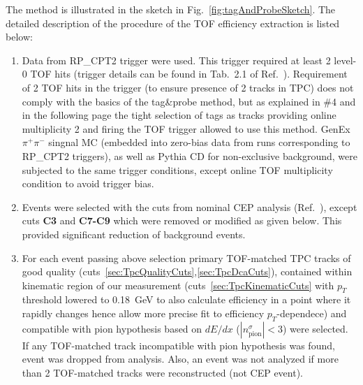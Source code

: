 The method is illustrated in the sketch in Fig.~\ref{fig:tagAndProbeSketch}. The detailed description of the procedure of the TOF efficiency extraction is listed below:
%
%
%
%
%
%
\begin{enumerate}
 \item Data from RP\_CPT2 trigger were used. This trigger required at least 2 level-0 TOF hits (trigger details can be found in Tab.~2.1 of Ref.~\cite{AnalysisNoteRafal}). Requirement of 2 TOF hits in the trigger (to ensure presence of 2 tracks in TPC) does not comply with the basics of the tag\&probe method, but as explained in \#4 and in the following page the tight selection of tags as tracks providing online multiplicity 2 and firing the TOF trigger allowed to use this method. GenEx $\pi^{+}\pi^{-}$ singnal MC (embedded into zero-bias data from runs corresponding to RP\_CPT2 triggers), as well as Pythia CD for non-exclusive background, were subjected to the same trigger conditions, except online TOF multiplicity condition to avoid trigger bias.\\[-20pt]%
 \item Events were selected with the cuts from nominal CEP analysis (Ref.~\cite{AnalysisNoteRafal}), except cuts \textbf{C3} and \textbf{C7-C9} which were removed or modified as given below. This provided significant reduction of background events.\\[-20pt]%
 \item For each event passing above selection primary TOF-matched TPC tracks of good quality (cuts~\ref{sec:TpcQualityCuts},\ref{sec:TpcDcaCuts}), contained within kinematic region of our measurement (cuts~\ref{sec:TpcKinematicCuts} with $p_{T}$ threshold lowered to 0.18~GeV to also calculate efficiency in a point where it rapidly changes hence allow more precise fit to efficiency $p_{T}$-dependece) and compatible with pion hypothesis based on $dE/dx$ ($|n^{\sigma}_{\text{pion}}|<3$) were selected. If any TOF-matched track incompatible with pion hypothesis was found, event was dropped from analysis. Also, an event was not analyzed if more than 2 TOF-matched tracks were reconstructed (not CEP event).\\[-20pt]%

\end{enumerate}

